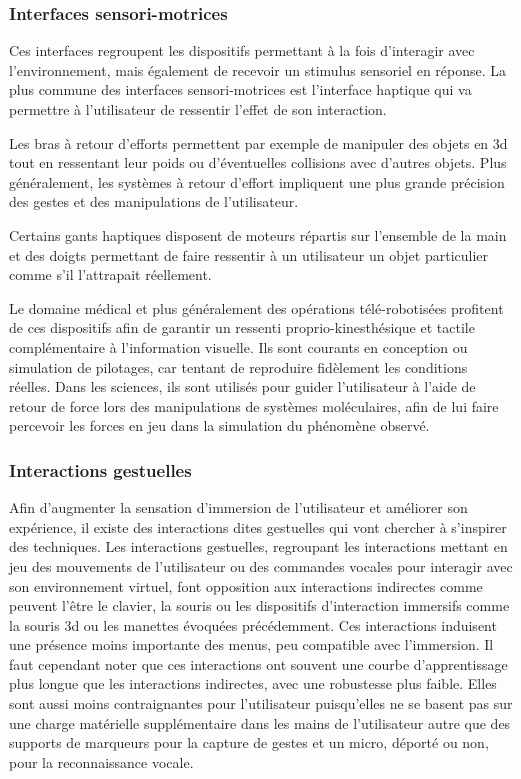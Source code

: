 \subsubsection{Interfaces sensori-motrices} \label{interface_sensor-motor}

 Ces interfaces regroupent les dispositifs permettant à la fois d'interagir avec l'environnement, mais également de recevoir un stimulus sensoriel en réponse. La plus commune des interfaces sensori-motrices est l'interface haptique qui va permettre à l'utilisateur de ressentir l'effet de son interaction. 

Les bras à retour d'efforts permettent par exemple de manipuler des objets en 3d tout en ressentant leur poids ou d'éventuelles collisions avec d'autres objets. Plus généralement, les systèmes à retour d'effort impliquent une plus grande précision des gestes et des manipulations de l'utilisateur.

Certains gants haptiques disposent de moteurs répartis sur l'ensemble de la main et des doigts permettant de faire ressentir à un utilisateur un objet particulier comme s'il l'attrapait réellement.

Le domaine médical et plus généralement des opérations télé-robotisées profitent de ces dispositifs afin de garantir un ressenti proprio-kinesthésique et tactile complémentaire à l'information visuelle. Ils sont courants en conception ou simulation de pilotages, car tentant de reproduire fidèlement les conditions réelles.
Dans les sciences, ils sont utilisés pour guider l'utilisateur à l'aide de retour de force lors des manipulations de systèmes moléculaires, afin de lui faire percevoir les forces en jeu dans la simulation du phénomène observé.

\subsubsection{Interactions gestuelles} \label{interface_nature}

Afin d'augmenter la sensation d'immersion de l'utilisateur et améliorer son expérience, il existe des interactions dites gestuelles qui vont chercher à s'inspirer des techniques.
Les interactions gestuelles, regroupant les interactions mettant en jeu des mouvements de l'utilisateur ou des commandes vocales pour interagir avec son environnement virtuel, font opposition aux interactions indirectes comme peuvent l'être le clavier, la souris ou les dispositifs d'interaction immersifs comme la souris 3d ou les manettes évoquées précédemment. Ces interactions induisent une présence moins importante des menus, peu compatible avec l'immersion. Il faut cependant noter que ces interactions ont souvent une courbe d'apprentissage plus longue que les interactions indirectes, avec une robustesse plus faible. Elles sont aussi moins contraignantes pour l'utilisateur puisqu'elles ne se basent pas sur une charge matérielle supplémentaire dans les mains de l'utilisateur autre que des supports de marqueurs pour la capture de gestes \cite{bossard2005gestural} et un micro, déporté ou non, pour la reconnaissance vocale. 

